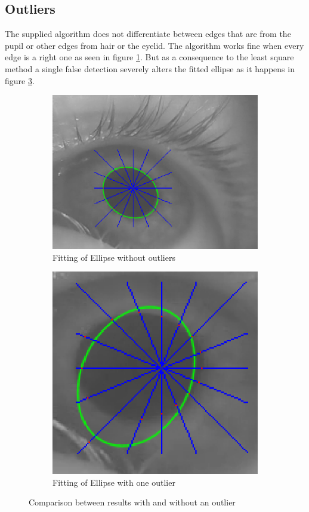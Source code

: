 \subsection{Outliers}
The supplied algorithm does not differentiate between edges that are from the pupil or other edges from hair or the eyelid. The algorithm works fine when every edge is a right one as seen in figure \ref{fig:oldGood}. But as a consequence to the least square method a single false detection severely alters the fitted ellipse as it happens in figure \ref{fig:oldOutlier}. 
\begin{figure}
	\begin{subfigure}{.5\textwidth}
		\centering
		\includegraphics[width=\linewidth]{images/good_fit_old.png}
		\caption{Fitting of Ellipse without outliers}
		\label{fig:oldGood}
	\end{subfigure}%
	\begin{subfigure}{.5\textwidth}
		\centering
		\includegraphics[width=.8\linewidth]{images/outlier_problem.png}
		\caption{Fitting of Ellipse with one outlier}
		\label{fig:oldOutlier}
	\end{subfigure}
\caption{Comparison between results with and without an outlier}

\end{figure}

